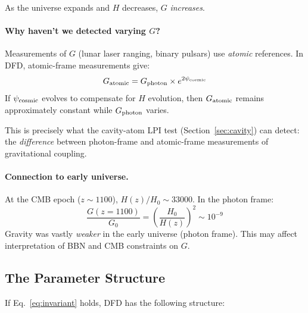 As the universe expands and $H$ decreases, $G$ \textit{increases}.

\paragraph{Why haven't we detected varying $G$?}
Measurements of $G$ (lunar laser ranging, binary pulsars) use \textit{atomic} references. In DFD, atomic-frame measurements give:
\begin{equation}
G_{\rm atomic} = G_{\rm photon} \times e^{2\psi_{\rm cosmic}}
\end{equation}
If $\psi_{\rm cosmic}$ evolves to compensate for $H$ evolution, then $G_{\rm atomic}$ remains approximately constant while $G_{\rm photon}$ varies.

This is precisely what the cavity-atom LPI test (Section~\ref{sec:cavity}) can detect: the \textit{difference} between photon-frame and atomic-frame measurements of gravitational coupling.

\paragraph{Connection to early universe.}
At the CMB epoch ($z \sim 1100$), $H(z)/H_0 \sim 33000$. In the photon frame:
\begin{equation}
\frac{G(z=1100)}{G_0} = \left(\frac{H_0}{H(z)}\right)^2 \sim 10^{-9}
\end{equation}
Gravity was vastly \textit{weaker} in the early universe (photon frame). This may affect interpretation of BBN and CMB constraints on $G$.

\subsection{The Parameter Structure}

If Eq.~\eqref{eq:invariant} holds, DFD has the following structure:

